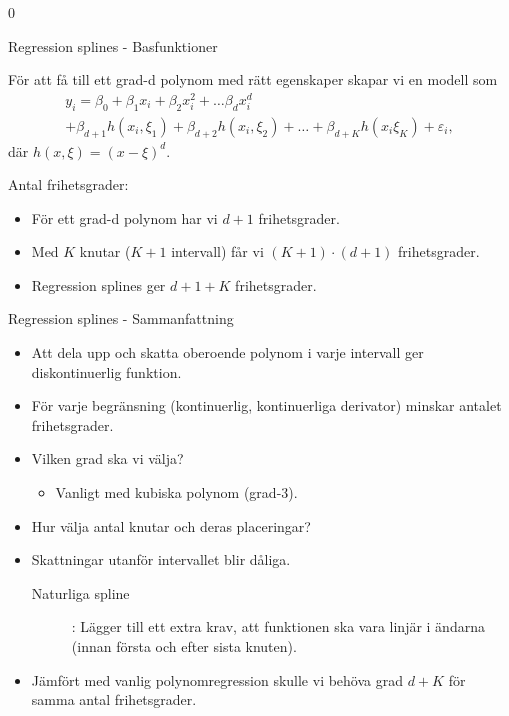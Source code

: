 0\documentclass[10pt,english]{beamer}
\begin{document}
\begin{frame}{Regression splines - Basfunktioner}

    För att få till ett grad-d polynom med rätt egenskaper skapar vi en modell som
    \begin{multline*}
        y_i = \beta_0 + \beta_1 x_i + \beta_2 x_i^2 + \ldots \beta_d x_i^d \\
        + \beta_{d+1} h(x_i, \xi_1) + \beta_{d+2} h(x_i, \xi_2) + \ldots + \beta_{d+K} h(x_i \xi_K) + \varepsilon_i,
    \end{multline*}
    där $h(x, \xi) = (x - \xi)^d$.

    Antal frihetsgrader:
    \begin{itemize}
        \item För ett grad-d polynom har vi $d+1$ frihetsgrader.
        \item Med $K$ knutar ($K+1$ intervall) får vi $(K+1)\cdot(d+1)$ frihetsgrader.
        \item Regression splines ger $d + 1 + K$ frihetsgrader.
    \end{itemize}
    
\end{frame}

\begin{frame}{Regression splines - Sammanfattning}

    \begin{itemize}
        \item Att dela upp och skatta oberoende polynom i varje intervall ger diskontinuerlig funktion.
        \item För varje begränsning (kontinuerlig, kontinuerliga derivator) minskar antalet frihetsgrader.
        \item Vilken grad ska vi välja?
        \begin{itemize}
            \item Vanligt med kubiska polynom (grad-3).
        \end{itemize}
        \item Hur välja antal knutar och deras placeringar?
        \item Skattningar utanför intervallet blir dåliga.
        \begin{description} 
            \item[Naturliga spline]: Lägger till ett extra krav, att funktionen ska vara linjär i ändarna (innan första och efter sista knuten). 
        \end{description}
        \item Jämfört med vanlig polynomregression skulle vi behöva grad $d+K$ för samma antal frihetsgrader.
    \end{itemize}
    
\end{frame}
\end{document}
